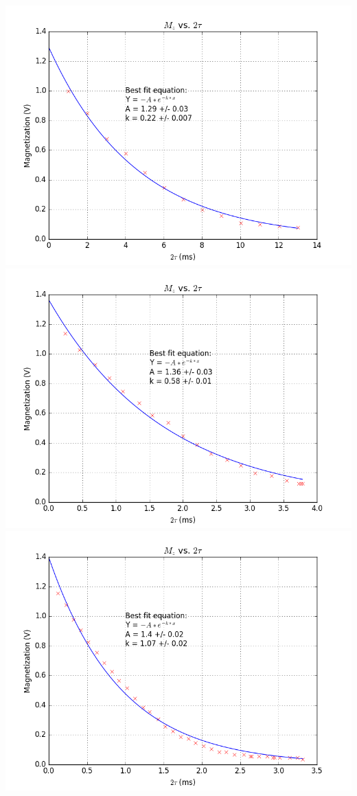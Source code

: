\documentclass{article}
\begin{document}
{\begin{multicols}{2}
\label{fig:30}
\includegraphics[width=\linewidth]{pic-for-report/a0200M-CuSO4-T2-MG.png}
\label{fig:31}
\includegraphics[width=\linewidth]{pic-for-report/a0500M-CuSO4-T2-MG.png}
\label{fig:32}
\includegraphics[width=\linewidth]{pic-for-report/a1000M-CuSO4-T2-MG.png}

\end{multicols}}
\end{document}

